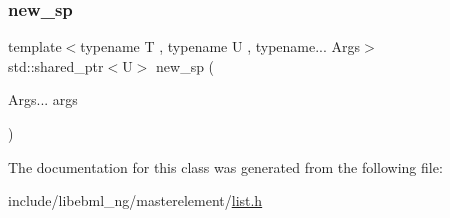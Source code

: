 \mbox{\label{classebml_1_1ebmlList_ace404b6adc012cac5ccd9c03160456e3}} 
\subsubsection{\texorpdfstring{new\+\_\+sp}{new\_sp}}
{\footnotesize\ttfamily template$<$typename T , typename U , typename... Args$>$ \\
std\+::shared\+\_\+ptr$<$U$>$ new\+\_\+sp (\begin{DoxyParamCaption}\item[{Args...}]{args }\end{DoxyParamCaption})\hspace{0.3cm}{\ttfamily [friend]}}



The documentation for this class was generated from the following file\+:\begin{DoxyCompactItemize}
\item 
include/libebml\+\_\+ng/masterelement/\mbox{\hyperlink{list_8h}{list.\+h}}\end{DoxyCompactItemize}
